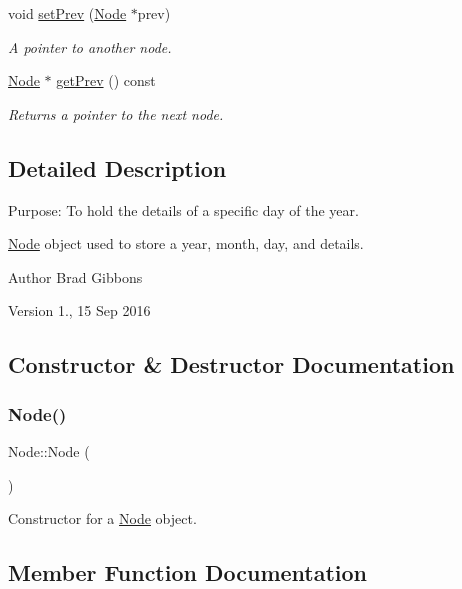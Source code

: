 \begin{DoxyCompactItemize}
void \hyperlink{class_node_a169576a90ab0bd0706491c445616c909}{set\+Prev} (\hyperlink{class_node}{Node} $\ast$prev)
\begin{DoxyCompactList}\small\item\em A pointer to another node. \end{DoxyCompactList}\item 
\hyperlink{class_node}{Node} $\ast$ \hyperlink{class_node_af3a5d9a808825f8fb5c3cbe1d51abe68}{get\+Prev} () const
\begin{DoxyCompactList}\small\item\em Returns a pointer to the next node. \end{DoxyCompactList}\end{DoxyCompactItemize}


\subsection{Detailed Description}
Purpose\+: To hold the details of a specific day of the year. 

\hyperlink{class_node}{Node} object used to store a year, month, day, and details. \begin{DoxyAuthor}{Author}
Brad Gibbons 
\end{DoxyAuthor}
\begin{DoxyVersion}{Version}
1., 15 Sep 2016 
\end{DoxyVersion}


\subsection{Constructor \& Destructor Documentation}
\hypertarget{class_node_ad7a34779cad45d997bfd6d3d8043c75f}{}\label{class_node_ad7a34779cad45d997bfd6d3d8043c75f} 
\subsubsection{\texorpdfstring{Node()}{Node()}}
{\footnotesize\ttfamily Node\+::\+Node (\begin{DoxyParamCaption}{ }\end{DoxyParamCaption})}



Constructor for a \hyperlink{class_node}{Node} object. 



\subsection{Member Function Documentation}
\hypertarget{class_node_a0f18850ca6a3b31325924e747003e3ce}{}\label{class_node_a0f18850ca6a3b31325924e747003e3ce} 
